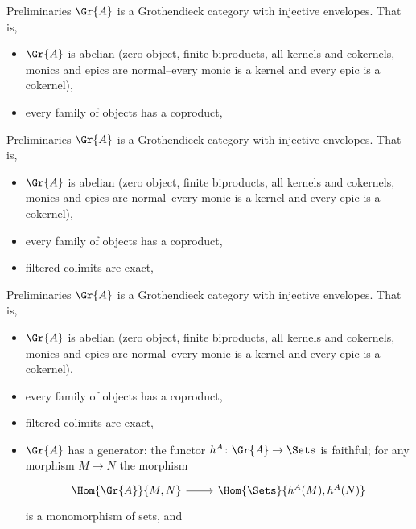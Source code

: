 \documentclass{beamer}
\theoremstyle{definition}
\begin{document}
\begin{frame}[fragile]{Preliminaries}
  $\Gr{A}$ is a Grothendieck category with injective envelopes.
  That is,
  \begin{itemize}
  \item
    $\Gr{A}$ is abelian (zero object, finite biproducts, all kernels and cokernels, monics and epics are normal--every monic is a kernel and every epic is a cokernel),
  \item
    every family of objects has a coproduct,
  \end{itemize}
\end{frame}

\begin{frame}[fragile]{Preliminaries}
  $\Gr{A}$ is a Grothendieck category with injective envelopes.
  That is,
  \begin{itemize}
  \item
    $\Gr{A}$ is abelian (zero object, finite biproducts, all kernels and cokernels, monics and epics are normal--every monic is a kernel and every epic is a cokernel),
  \item
    every family of objects has a coproduct,
  \item
    filtered colimits are exact,
  \end{itemize}
\end{frame}

\begin{frame}[fragile]{Preliminaries}
  $\Gr{A}$ is a Grothendieck category with injective envelopes.
  That is,
  \begin{itemize}
  \item
    $\Gr{A}$ is abelian (zero object, finite biproducts, all kernels and cokernels, monics and epics are normal--every monic is a kernel and every epic is a cokernel),
  \item
    every family of objects has a coproduct,
  \item
    filtered colimits are exact,
  \item
    $\Gr{A}$ has a generator: the functor $h^A \colon \Gr{A} \rightarrow \Sets$ is faithful; for any morphism $M \rightarrow N$ the morphism
    $$\begin{tikzcd}
      \Hom{\Gr{A}}{M, N} \arrow{r}& \Hom{\Sets}{h^A(M), h^A(N)}
    \end{tikzcd}$$
    is a monomorphism of sets, and
  \end{itemize}
\end{frame}
\end{document}
